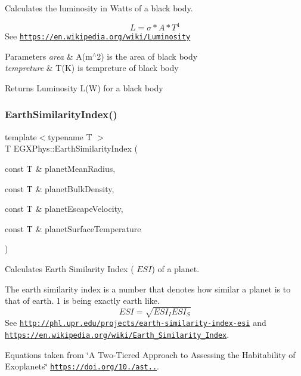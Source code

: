 Calculates the luminosity in Watts of a black body. 

\[L=\sigma*A*T^4\] See \href{https://en.wikipedia.org/wiki/Luminosity}{\tt https\+://en.\+wikipedia.\+org/wiki/\+Luminosity}


\begin{DoxyParams}{Parameters}
{\em area} & A(m$^\wedge$2) is the area of black body \\
\hline
{\em tempreture} & T(\+K) is tempreture of black body \\
\hline
\end{DoxyParams}
\begin{DoxyReturn}{Returns}
Luminosity L(\+W) for a black body 
\end{DoxyReturn}
\mbox{\label{group___astrophysics_ga4b86397b1c839c49ac599d49fda207d4}} 
\subsubsection{\texorpdfstring{Earth\+Similarity\+Index()}{EarthSimilarityIndex()}}
{\footnotesize\ttfamily template$<$typename T $>$ \\
T E\+G\+X\+Phys\+::\+Earth\+Similarity\+Index (\begin{DoxyParamCaption}\item[{const T \&}]{planet\+Mean\+Radius,  }\item[{const T \&}]{planet\+Bulk\+Density,  }\item[{const T \&}]{planet\+Escape\+Velocity,  }\item[{const T \&}]{planet\+Surface\+Temperature }\end{DoxyParamCaption})}



Calculates Earth Similarity Index ( $ESI$) of a planet. 

The earth similarity index is a number that denotes how similar a planet is to that of earth. 1 is being exactly earth like. \[ESI=\sqrt{ESI_I ESI_S}\] See \href{http://phl.upr.edu/projects/earth-similarity-index-esi}{\tt http\+://phl.\+upr.\+edu/projects/earth-\/similarity-\/index-\/esi} and \href{https://en.wikipedia.org/wiki/Earth_Similarity_Index}{\tt https\+://en.\+wikipedia.\+org/wiki/\+Earth\+\_\+\+Similarity\+\_\+\+Index}.

Equations taken from \char`\"{}\+A Two-\/\+Tiered Approach to Assessing the Habitability of Exoplanets\char`\"{} \href{https://doi.org/10.1089/ast.2010.0592}{\tt https\+://doi.\+org/10./ast..}.


